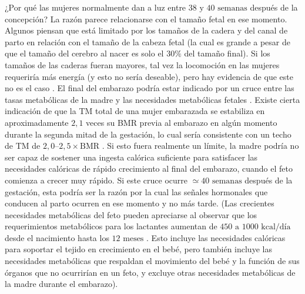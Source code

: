 \documentclass[12pt]{book}
\begin{document}
¿Por qué las mujeres normalmente dan a luz entre $38\text{ y }40\text{ semanas}$ después de la concepción? La razón parece relacionarse con el tamaño fetal en ese momento. Algunos piensan que está limitado por los tamaños de la cadera y del canal de parto en relación con el tamaño de la cabeza fetal (la cual es grande a pesar de que el tamaño del cerebro al nacer es solo el $30\%$ del tamaño final). Si los tamaños de las caderas fueran mayores, tal vez la locomoción en las mujeres requeriría más energía (y esto no sería deseable), pero hay evidencia de que este no es el caso \cite{29}. El final del embarazo podría estar indicado por un cruce entre las tasas metabólicas de la madre y las necesidades metabólicas fetales \cite{29,30}. Existe cierta indicación de que la TM total de una mujer embarazada se estabiliza en aproximadamente $2{,}1$ veces su BMR previa al embarazo en algún momento durante la segunda mitad de la gestación, lo cual sería consistente con un techo de TM de $2{,}0\text{--}2{,}5 \times \text{BMR}$ \cite{29,46,78}. Si esto fuera realmente un límite, la madre podría no ser capaz de sostener una ingesta calórica suficiente para satisfacer las necesidades calóricas de rápido crecimiento al final del embarazo, cuando el feto comienza a crecer muy rápido. Si este cruce ocurre $\simeq 40\text{ semanas}$ después de la gestación, esta podría ser la razón por la cual las señales hormonales que conducen al parto ocurren en ese momento y no más tarde. (Las crecientes necesidades metabólicas del feto pueden apreciarse al observar que los requerimientos metabólicos para los lactantes aumentan de $450\text{ a }1000\text{ kcal/día}$ desde el nacimiento hasta los $12\text{ meses}$ \cite{33}. Esto incluye las necesidades calóricas para soportar el tejido en crecimiento en el bebé, pero también incluye las necesidades metabólicas que respaldan el movimiento del bebé y la función de sus órganos que no ocurrirían en un feto, y excluye otras necesidades metabólicas de la madre durante el embarazo).
\end{document}
